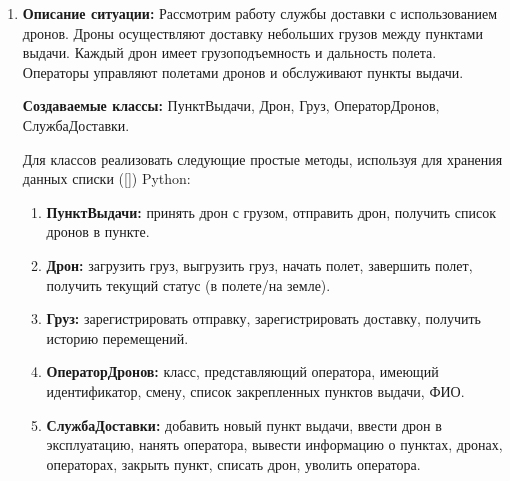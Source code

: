 \begin{enumerate}
\item
\textbf{Описание ситуации:}
Рассмотрим работу службы доставки с использованием дронов. 
Дроны осуществляют доставку небольших грузов между пунктами выдачи. 
Каждый дрон имеет грузоподъемность и дальность полета. 
Операторы управляют полетами дронов и обслуживают пункты выдачи.

\textbf{Создаваемые классы:} ПунктВыдачи, Дрон, Груз, ОператорДронов, СлужбаДоставки.

Для классов реализовать следующие простые методы, используя для хранения данных списки ([]) Python:
\begin{enumerate}
\item \textbf{ПунктВыдачи:} принять дрон с грузом, отправить дрон, получить список дронов в пункте.
\item \textbf{Дрон:} загрузить груз, выгрузить груз, 
начать полет, завершить полет, получить текущий статус (в полете/на земле).
\item \textbf{Груз:} зарегистрировать отправку, зарегистрировать доставку, 
получить историю перемещений.
\item \textbf{ОператорДронов:} класс, представляющий оператора, 
имеющий идентификатор, смену, список закрепленных пунктов выдачи, ФИО.
\item \textbf{СлужбаДоставки:} добавить новый пункт выдачи, 
ввести дрон в эксплуатацию, нанять оператора, вывести информацию о пунктах, 
дронах, операторах, закрыть пункт, списать дрон, уволить оператора.
\end{enumerate}

\end{enumerate}